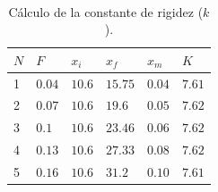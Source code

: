 \begin{table}[H]
	\centering
	\parbox{7cm}{%
		\caption{Cálculo de la constante de rigidez ($k$).}\label{tab:04}}\\
	\begin{tabular}{C{0.5cm}C{1cm}C{1cm}C{1cm}C{1cm}C{1cm}}
		\hline
		$N$ & $F$    & $x_i$  & $x_f$   & $x_m$  & $K$    \\                      & $0.04$ & $10.6$ & $15.75$ & $0.04$ & $7.61$ \\
		2                     & $0.07$ & $10.6$ & $19.6$  & $0.05$ & $7.62$ \\
		3                     & $0.1$  & $10.6$ & $23.46$ & $0.06$ & $7.62$ \\
		4                     & $0.13$ & $10.6$ & $27.33$ & $0.08$ & $7.62$ \\
		5                     & $0.16$ & $10.6$ & $31.2$  & $0.10$ & $7.61$ \\
		\midrule
	\end{tabular}
\end{table}
